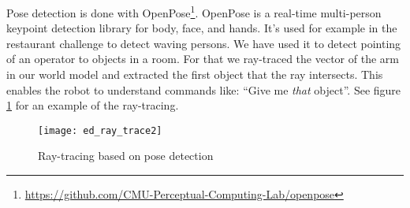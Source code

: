 Pose detection is done with OpenPose\footnote{\url{https://github.com/CMU-Perceptual-Computing-Lab/openpose}}.
OpenPose is a real-time multi-person keypoint detection library for body, face, and hands.
It's used for example in the restaurant challenge to detect waving persons.
We have used it to detect pointing of an operator to objects in a room.
For that we ray-traced the vector of the arm in our world model and extracted the first object that the ray intersects.
This enables the robot to understand commands like: ``Give me \emph{that} object''.
See figure \ref{fig:ray_trace} for an example of the ray-tracing.

\begin{figure}[H]
	\centering
    \texttt{[image: ed\_ray\_trace2]}
	\caption{Ray-tracing based on pose detection}
	\label{fig:ray_trace}
\end{figure}
